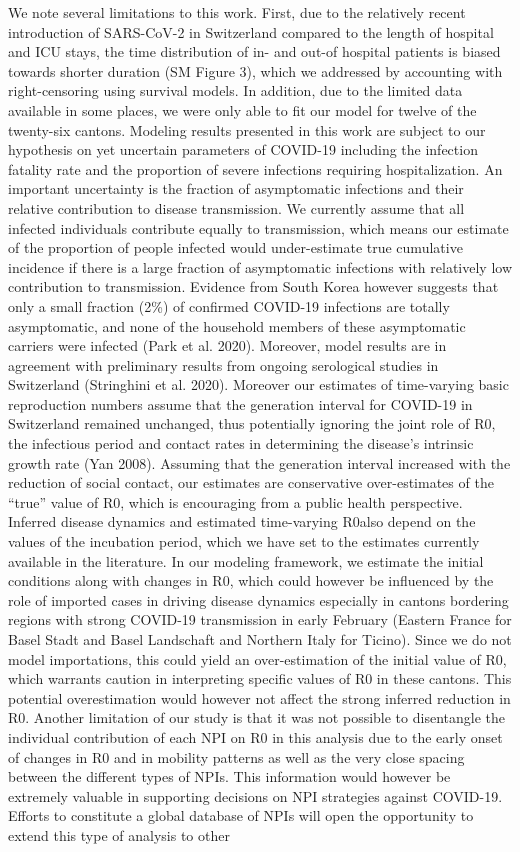 We note several limitations to this work. First, due to the relatively recent introduction of SARS-CoV-2 in Switzerland compared to the length of hospital and ICU stays, the time distribution of  in- and out-of hospital patients is biased towards shorter duration (SM Figure 3), which we addressed by accounting with right-censoring using survival models. In addition, due to the limited data available in some places, we were only able to fit our model for twelve of the twenty-six cantons. Modeling results presented in this work are subject to our hypothesis on yet uncertain parameters of COVID-19 including the infection fatality rate and the proportion of severe infections requiring hospitalization. An important uncertainty is the fraction of asymptomatic infections and their relative contribution to disease transmission. We currently assume that all infected individuals contribute equally to transmission, which means our estimate of the proportion of people infected would under-estimate true cumulative incidence if there is a large fraction of asymptomatic infections with relatively low contribution to transmission. Evidence from South Korea however suggests that only a small fraction (2\%) of confirmed COVID-19 infections are totally asymptomatic, and none of the household members of these asymptomatic carriers were infected (Park et al. 2020). Moreover, model results are in agreement with preliminary results from ongoing serological studies in Switzerland (Stringhini et al. 2020). Moreover our estimates of time-varying basic reproduction numbers assume that the generation interval for COVID-19 in Switzerland remained unchanged, thus potentially ignoring the joint role of R0, the infectious period and contact rates in determining the disease’s intrinsic growth rate (Yan 2008). Assuming that the generation interval increased with the reduction of social contact, our estimates are conservative over-estimates of the “true” value of R0, which is encouraging from a public health perspective. Inferred disease dynamics and estimated time-varying R0also depend on the values of the incubation period, which we have set to the estimates currently available in the literature. In our modeling framework, we estimate the initial conditions along with changes in R0, which could however be influenced by the role of imported cases in driving disease dynamics especially in cantons bordering regions with strong COVID-19 transmission in early February (Eastern France for Basel Stadt and Basel Landschaft and Northern Italy for Ticino). Since we do not model importations, this could yield an over-estimation of the initial value of R0, which warrants caution in interpreting specific values of R0 in these cantons. This potential overestimation would however not affect the strong inferred reduction in R0. Another limitation of our study is that it was not possible to disentangle the individual contribution of each NPI on R0 in this analysis due to the early onset of changes in R0 and in mobility patterns as well as the very close spacing between the different types of NPIs. This information would however be extremely valuable in supporting decisions on NPI strategies against COVID-19. Efforts to constitute a global database of NPIs will open the opportunity to extend this type of analysis to other 